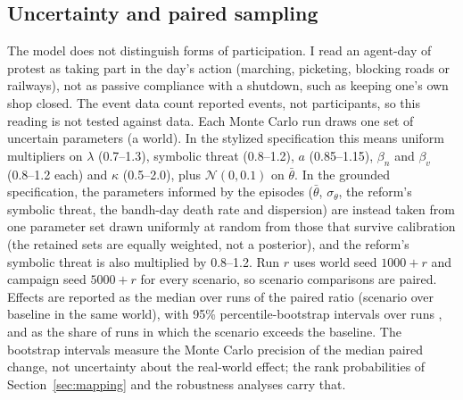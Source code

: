 \documentclass[11pt,a4paper]{article}
\begin{document}
\subsection{Uncertainty and paired sampling}
The model does not distinguish forms of participation. I read an agent-day of protest as taking part in the day's action (marching, picketing, blocking roads or railways), not as passive compliance with a shutdown, such as keeping one's own shop closed. The event data count reported events, not participants, so this reading is not tested against data. Each Monte Carlo run draws one set of uncertain parameters (a world). In the stylized specification this means uniform multipliers on $\lambda$ (0.7--1.3), symbolic threat (0.8--1.2), $a$ (0.85--1.15), $\beta_n$ and $\beta_v$ (0.8--1.2 each) and $\kappa$ (0.5--2.0), plus $\mathcal N(0,0.1)$ on $\bar\theta$. In the grounded specification, the parameters informed by the episodes ($\bar\theta$, $\sigma_\theta$, the reform's symbolic threat, the bandh-day death rate and dispersion) are instead taken from one parameter set drawn uniformly at random from those that survive calibration (the retained sets are equally weighted, not a posterior), and the reform's symbolic threat is also multiplied by 0.8--1.2. Run $r$ uses world seed $1000+r$ and campaign seed $5000+r$ for every scenario, so scenario comparisons are paired. Effects are reported as the median over runs of the paired ratio (scenario over baseline in the same world), with 95\% percentile-bootstrap intervals over runs \citep{efron1993}, and as the share of runs in which the scenario exceeds the baseline. The bootstrap intervals measure the Monte Carlo precision of the median paired change, not uncertainty about the real-world effect; the rank probabilities of Section~\ref{sec:mapping} and the robustness analyses carry that.
\end{document}
